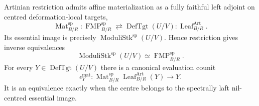 \begin{theorem}
\label{thm:bnli-affine-materialization-equivalence}
Artinian restriction admits affine materialization as a fully faithful left
adjoint on centred deformation-local targets,
\[
\boxed{
    \operatorname{Mat}^{\mathrm{sp}}_{B/R}:
    \operatorname{FMP}^{\mathrm{sp}}_{B/R}
    \rightleftarrows
    \operatorname{DefTgt}(U/V):
    \operatorname{Leaf}^{\mathrm{Art}}_{B/R}.}
\]
Its essential image is precisely
$\operatorname{ModuliStk}^{\mathrm{sp}}(U/V)$.  Hence restriction gives inverse
equivalences
\[
\boxed{
    \operatorname{ModuliStk}^{\mathrm{sp}}(U/V)
    \simeq
    \operatorname{FMP}^{\mathrm{sp}}_{B/R}.}
\]
For every $Y\in\operatorname{DefTgt}(U/V)$ there is a canonical evaluation
counit
\[
\boxed{
    \epsilon_Y^{\mathrm{mat}}:
    \operatorname{Mat}^{\mathrm{sp}}_{B/R}
    \operatorname{Leaf}^{\mathrm{Art}}_{B/R}(Y)
    \longrightarrow Y.}
\]
It is an equivalence exactly when the centre belongs to the spectrally laft
nil-centred essential image.
\end{theorem}

